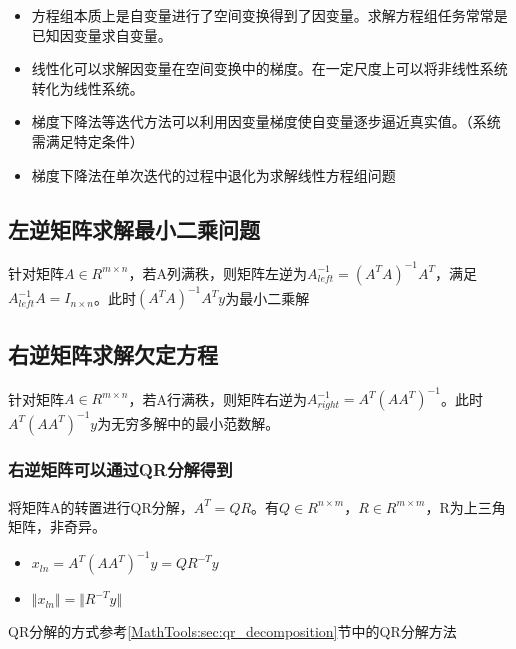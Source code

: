 \begin{lemmabox}[一些有意思的思考]
	\begin{itemize}
  \item 方程组本质上是自变量进行了空间变换得到了因变量。求解方程组任务常常是已知因变量求自变量。
  \item 线性化可以求解因变量在空间变换中的梯度。在一定尺度上可以将非线性系统转化为线性系统。
  \item 梯度下降法等迭代方法可以利用因变量梯度使自变量逐步逼近真实值。（系统需满足特定条件）
  \item 梯度下降法在单次迭代的过程中退化为求解线性方程组问题
\end{itemize}
\end{lemmabox}

\subsection{左逆矩阵求解最小二乘问题}
\begin{theorembox}
	针对矩阵$A \in R^{m\times n}$，若A列满秩，则矩阵左逆为$A_{left}^{-1} = (A^TA)^{-1}A^T$，满足$A_{left}^{-1}A = I_{n \times n}$。此时$(A^TA)^{-1}A^Ty$为最小二乘解
\end{theorembox}
\subsection{右逆矩阵求解欠定方程}
\begin{theorembox}
	针对矩阵$A \in R^{m\times n}$，若A行满秩，则矩阵右逆为$A_{right}^{-1} = A^T(AA^T)^{-1}$。此时$A^T(AA^T)^{-1}y$为无穷多解中的最小范数解。
\end{theorembox}
\subsubsection{右逆矩阵可以通过QR分解得到}

\begin{theorembox}[通过QR分解求解右逆矩阵]
	将矩阵A的转置进行QR分解，$A^T = QR$。有$Q\in R^{n\times m}$，$R\in R^{m\times m}$，R为上三角矩阵，非奇异。
	\begin{itemize}
  		\item $x_{ln} = A^T(AA^T)^{-1}y = QR^{-T}y$
  		\item $\Vert x_{ln}\Vert = \Vert R^{-T}y\Vert$
	\end{itemize}
\end{theorembox}

QR分解的方式参考\ref{MathTools:sec:qr_decomposition}节中的QR分解方法

